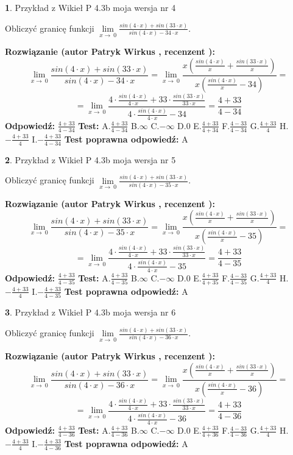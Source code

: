 \documentclass[12pt, a4paper]{article}
\theoremstyle{definition} %
\newtheorem{zad}{}
\newcommand{\zadStart}[1]{\begin{zad}#1\newline}
\newcommand{\zadStop}{\end{zad}}
\newcommand{\rozwStart}[2]{\noindent \textbf{Rozwiązanie (autor #1 , recenzent #2): }\newline}
\newcommand{\rozwStop}{\newline}
\newcommand{\odpStart}{\noindent \textbf{Odpowiedź:}\newline}
\newcommand{\odpStop}{\newline}
\newcommand{\testStart}{\noindent \textbf{Test:}\newline}
\newcommand{\testStop}{\newline}
\newcommand{\kluczStart}{\noindent \textbf{Test poprawna odpowiedź:}\newline}
\newcommand{\kluczStop}{\newline}
\begin{document}
\zadStart{Przykład z Wikieł P 4.3b moja wersja nr 4}


Obliczyć granicę funkcji $\lim\limits_{x\to\ 0}\frac{sin(4 \cdot x)+sin(33 \cdot x)}{sin(4 \cdot x)-34 \cdot x}$.
\zadStop
\rozwStart{Patryk Wirkus}{}
$$\lim\limits_{x\to\ 0}\frac{sin(4 \cdot x)+sin(33 \cdot x)}{sin(4 \cdot x)-34 \cdot x}=\lim\limits_{x\to\ 0}\frac{x(\frac{sin(4 \cdot x)}{x}+\frac{sin(33 \cdot x)}{x})}{x(\frac{sin(4 \cdot x)}{x}-34)}=$$
$$=\lim\limits_{x\to\ 0}\frac{4 \cdot \frac{sin(4 \cdot x)}{4 \cdot x}+33 \cdot \frac{sin(33 \cdot x)}{33 \cdot x}}{4 \cdot \frac{sin(4 \cdot x)}{4 \cdot x}-34}=\frac{4+33}{4-34}$$
\rozwStop
\odpStart
$\frac{4+33}{4-34}$
\odpStop
\testStart
A.$\frac{4+33}{4-34}$
B.$\infty$
C.$-\infty$
D.$0$
E.$\frac{4+33}{4+34}$
F.$\frac{4-33}{4-34}$
G.$\frac{4+33}{4}$
H.$-\frac{4+33}{4}$
I.$-\frac{4+33}{4-34}$
\testStop
\kluczStart
A
\kluczStop



\zadStart{Przykład z Wikieł P 4.3b moja wersja nr 5}


Obliczyć granicę funkcji $\lim\limits_{x\to\ 0}\frac{sin(4 \cdot x)+sin(33 \cdot x)}{sin(4 \cdot x)-35 \cdot x}$.
\zadStop
\rozwStart{Patryk Wirkus}{}
$$\lim\limits_{x\to\ 0}\frac{sin(4 \cdot x)+sin(33 \cdot x)}{sin(4 \cdot x)-35 \cdot x}=\lim\limits_{x\to\ 0}\frac{x(\frac{sin(4 \cdot x)}{x}+\frac{sin(33 \cdot x)}{x})}{x(\frac{sin(4 \cdot x)}{x}-35)}=$$
$$=\lim\limits_{x\to\ 0}\frac{4 \cdot \frac{sin(4 \cdot x)}{4 \cdot x}+33 \cdot \frac{sin(33 \cdot x)}{33 \cdot x}}{4 \cdot \frac{sin(4 \cdot x)}{4 \cdot x}-35}=\frac{4+33}{4-35}$$
\rozwStop
\odpStart
$\frac{4+33}{4-35}$
\odpStop
\testStart
A.$\frac{4+33}{4-35}$
B.$\infty$
C.$-\infty$
D.$0$
E.$\frac{4+33}{4+35}$
F.$\frac{4-33}{4-35}$
G.$\frac{4+33}{4}$
H.$-\frac{4+33}{4}$
I.$-\frac{4+33}{4-35}$
\testStop
\kluczStart
A
\kluczStop



\zadStart{Przykład z Wikieł P 4.3b moja wersja nr 6}


Obliczyć granicę funkcji $\lim\limits_{x\to\ 0}\frac{sin(4 \cdot x)+sin(33 \cdot x)}{sin(4 \cdot x)-36 \cdot x}$.
\zadStop
\rozwStart{Patryk Wirkus}{}
$$\lim\limits_{x\to\ 0}\frac{sin(4 \cdot x)+sin(33 \cdot x)}{sin(4 \cdot x)-36 \cdot x}=\lim\limits_{x\to\ 0}\frac{x(\frac{sin(4 \cdot x)}{x}+\frac{sin(33 \cdot x)}{x})}{x(\frac{sin(4 \cdot x)}{x}-36)}=$$
$$=\lim\limits_{x\to\ 0}\frac{4 \cdot \frac{sin(4 \cdot x)}{4 \cdot x}+33 \cdot \frac{sin(33 \cdot x)}{33 \cdot x}}{4 \cdot \frac{sin(4 \cdot x)}{4 \cdot x}-36}=\frac{4+33}{4-36}$$
\rozwStop
\odpStart
$\frac{4+33}{4-36}$
\odpStop
\testStart
A.$\frac{4+33}{4-36}$
B.$\infty$
C.$-\infty$
D.$0$
E.$\frac{4+33}{4+36}$
F.$\frac{4-33}{4-36}$
G.$\frac{4+33}{4}$
H.$-\frac{4+33}{4}$
I.$-\frac{4+33}{4-36}$
\testStop
\kluczStart
A
\kluczStop
\end{document}
